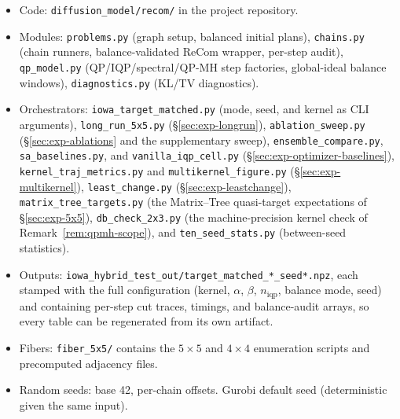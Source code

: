 \documentclass[11pt]{article}
\begin{document}
\begin{itemize}
  \item Code: \texttt{diffusion\_model/recom/} in the project
    repository.
  \item Modules: \texttt{problems.py} (graph setup, balanced initial
    plans), \texttt{chains.py} (chain runners, balance-validated
    ReCom wrapper, per-step audit), \texttt{qp\_model.py}
    (QP/IQP/spectral/QP-MH step factories, global-ideal balance
    windows), \texttt{diagnostics.py} (KL/TV diagnostics).
  \item Orchestrators: \texttt{iowa\_target\_matched.py} (mode, seed,
    and kernel as CLI arguments), \texttt{long\_run\_5x5.py}
    (\S\ref{sec:exp-longrun}), \texttt{ablation\_sweep.py}
    (\S\ref{sec:exp-ablations} and the supplementary sweep),
    \texttt{ensemble\_compare.py}, \texttt{sa\_baselines.py}, and
    \texttt{vanilla\_iqp\_cell.py}
    (\S\ref{sec:exp-optimizer-baselines}),
    \texttt{kernel\_traj\_metrics.py} and
    \texttt{multikernel\_figure.py} (\S\ref{sec:exp-multikernel}),
    \texttt{least\_change.py} (\S\ref{sec:exp-leastchange}),
    \texttt{matrix\_tree\_targets.py} (the Matrix--Tree
    quasi-target expectations of \S\ref{sec:exp-5x5}),
    \texttt{db\_check\_2x3.py} (the machine-precision kernel check of
    Remark~\ref{rem:qpmh-scope}), and
    \texttt{ten\_seed\_stats.py} (between-seed statistics).
  \item Outputs:
    \texttt{iowa\_hybrid\_test\_out/target\_matched\_*\_seed*.npz},
    each stamped with the full configuration (kernel, $\alpha$,
    $\beta$, $n_{\mathrm{iqp}}$, balance mode, seed) and containing
    per-step cut traces, timings, and balance-audit arrays, so every
    table can be regenerated from its own artifact.
  \item Fibers: \texttt{fiber\_5x5/} contains the $5 \times 5$ and
    $4 \times 4$ enumeration scripts and precomputed
    adjacency files.
  \item Random seeds: base 42, per-chain offsets. Gurobi default seed
    (deterministic given the same input).
\end{itemize}



\end{document}
